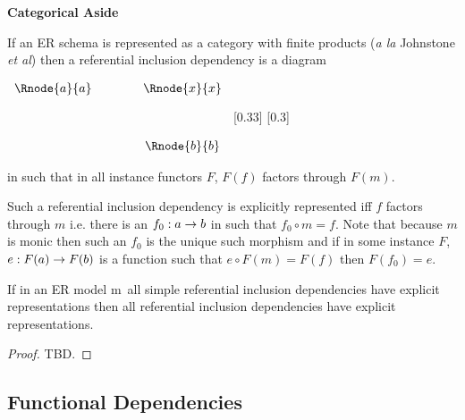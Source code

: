 \documentclass[10pt,a4paper]{article}
\newenvironment{categoricalaside}
{\begin{framed}
\textbf{Categorical Aside}
}
{
\end{framed}
}
\newcommand{\genericmodel}{\mathcal{M}}
\renewcommand{\genericmodel}{{m}}
\begin{document}
\begin{categoricalaside}
If an ER schema is represented as a category with finite products (\textit{a la} Johnstone \textit{et al}) then
a referential inclusion dependency is a  diagram
\begin{center}
$
\begin{array}{cp{0.75cm}c}
   \Rnode{a}{a}     & & \Rnode{x}{x}  \\[1.2cm]     
	                  & & \Rnode{b}{b}  
\end{array}
$
[0.33]
[0.3]
\idcomp
\end{center}
\noindent
in  such that in all instance functors $F$, 
$F(f)$ factors through $F(m)$.

Such a referential inclusion dependency is explicitly represented iff
 $f$ factors through $m$ i.e. there is an $f_0: a \rightarrow b$ in  such that 
$f_0 \circ m =f$. Note that because $m$ is monic then such an $f_0$ is the unique such morphism and if in some instance $F$,
$e: F(a) \rightarrow F(b)$ is a function such that $e \circ F(m) = F(f)$ then $F(f_0)=e$. 
\end{categoricalaside}

\begin{lemma}
\label{simplerepresentationlemma}
If in an ER model \genericmodel\ all simple referential inclusion dependencies
have explicit representations  then all referential inclusion dependencies have explicit representations. 
\end{lemma}
\begin{proof}
TBD.
\end{proof}

\subsection{Functional Dependencies}
\end{document}
